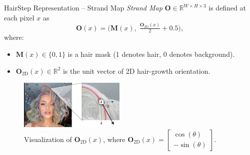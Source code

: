 \begin{frame}[t]{HairStep Representation -- Strand Map}
    \textit{Strand Map} $\mathbf{O} \in \mathbb{R}^{W \times H \times 3}$ is defined at each pixel $x$ as
    \begin{equation}
        \mathbf{O}(x) = \bigl(\mathbf{M}(x),\; \tfrac{\mathbf{O}_{\mathrm{2D}}(x)}{2} + 0.5\bigr),
        \label{eq:strand_map}
    \end{equation}
    where:
    \begin{itemize}
        \item $\mathbf{M}(x) \in \{0, 1\}$ is a hair mask (1 denotes hair, 0 denotes background).
        \item $\mathbf{O}_{\mathrm{2D}}(x) \in \mathbb{R}^2$ is the unit vector of 2D hair-growth orientation.
    \end{itemize}
    
    \begin{figure}[t]
        \centering
        \includegraphics[width=0.45\textwidth]{assets/figures/method/hisa/o_2d.png}
        \caption{Visualization of $\mathbf{O}_{\mathrm{2D}}(x)$, where 
        $\mathbf{O}_{\mathrm{2D}}(x) = \begin{bmatrix}\cos(\theta) \\ -\sin(\theta)\end{bmatrix}$.}
        \label{fig:o_2d_example}
    \end{figure}
\end{frame}

